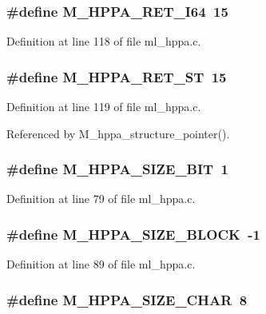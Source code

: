 \subsubsection{\setlength{\rightskip}{0pt plus 5cm}\#define M\_\-HPPA\_\-RET\_\-I64~15}\label{ml__hppa_8c_ec32a989f026b26673127597aab7528a}




Definition at line 118 of file ml\_\-hppa.c.
\subsubsection{\setlength{\rightskip}{0pt plus 5cm}\#define M\_\-HPPA\_\-RET\_\-ST~15}\label{ml__hppa_8c_64815e809bd54a7e438579df49a304f8}




Definition at line 119 of file ml\_\-hppa.c.

Referenced by M\_\-hppa\_\-structure\_\-pointer().
\subsubsection{\setlength{\rightskip}{0pt plus 5cm}\#define M\_\-HPPA\_\-SIZE\_\-BIT~1}\label{ml__hppa_8c_dc56e3c77d9abce22fcf85243daea802}




Definition at line 79 of file ml\_\-hppa.c.
\subsubsection{\setlength{\rightskip}{0pt plus 5cm}\#define M\_\-HPPA\_\-SIZE\_\-BLOCK~-1}\label{ml__hppa_8c_c766e2bb31b6fc778964ce0e9bc9025c}




Definition at line 89 of file ml\_\-hppa.c.
\subsubsection{\setlength{\rightskip}{0pt plus 5cm}\#define M\_\-HPPA\_\-SIZE\_\-CHAR~8}\label{ml__hppa_8c_6a8549bbe303adec13ed65f7f5d644b8}




